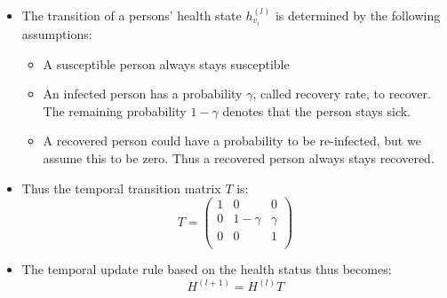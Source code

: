 \begin{itemize}
\begin{itemize}
		\item The transition of a persons' health state $h_{v_i}^{(l)}$ is determined by the following assumptions:
		\begin{itemize}
			\item A susceptible person always stays susceptible
			\item An infected person has a probability $\gamma$, called recovery rate, to recover. The remaining probability $1-\gamma$ denotes that the person stays sick.
			\item A recovered person could have a probability to be re-infected, but we assume this to be zero. Thus a recovered person always stays recovered.
		\end{itemize}
		\item Thus the temporal transition matrix $T$ is:
		\begin{equation}
			T = 
			\begin{pmatrix}
				1 &     0    & 0      \\
				0 & 1-\gamma & \gamma \\
				0 &     0    & 1      \\
			\end{pmatrix}
		\end{equation}
		\item The temporal update rule based on the health status thus becomes:
		\begin{equation}
			H^{(l+1)} = H^{(l)} T
		\end{equation}
	\end{itemize}
\end{itemize}